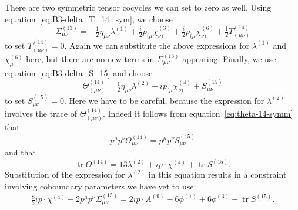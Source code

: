 \documentclass[11pt,reqno,a4paper,final]{amsart}
\theoremstyle{plain}
\theoremstyle{definition}
\newcommand{\phisup}[1]{\phi^{(#1)}}
\newcommand{\tr}{\operatorname{tr}}
\newcommand{\1}{\mathbb{1}}
\numberwithin{equation}{section}
\begin{document}
\begin{appendices}
There are two symmetric tensor cocycles we can set to zero as well.
Using equation~\eqref{eq:B3-delta_T_14_sym}, we choose
\begin{equation}
  \Sigma_{\mu\nu}^{(13)} = -\tfrac12 \eta_{\mu\nu} \lambda^{(1)} +   \tfrac i2 p_{(\mu} \chi_{\nu)}^{(3)} + \tfrac i2 p_{(\mu}  \chi_{\nu)}^{(6)} + \tfrac12 T_{(\mu\nu)}^{(14)}
\end{equation}
to set $T_{(\mu\nu)}^{(14)}=0$.  Again we can substitute
the above expressions for $\lambda^{(1)}$ and $\chi_\mu^{(6)}$ here,
but there are no new terms in $\Sigma_{\mu\nu}^{(13)}$ appearing.
Finally, we use equation~\eqref{eq:B3-delta_S_15} and choose
\begin{equation}
  \label{eq:theta-14-symm}
  \Theta_{(\mu\nu)}^{(14)}= \tfrac 12 \eta_{\mu\nu} \lambda^{(2)} + i  p_{(\mu} \chi_{\nu)}^{(4)} + S_{\mu\nu}^{(15)}
\end{equation}
to set $S_{\mu\nu}^{(15)}=0$.  Here we have to be careful, because the
expression for $\lambda^{(2)}$ involves the trace of
$\Theta_{(\mu\nu)}^{(14)}$.  Indeed it follows from
equation~\eqref{eq:theta-14-symm} that
\begin{equation}
  p^\mu p^\nu \Theta_{\mu\nu}^{(14)} = p^\mu p^\nu S_{\mu\nu}^{(15)}
\end{equation}
and that
\begin{equation}
  \tr\Theta^{(14)} = 13 \lambda^{(2)} + i p \cdot \chi^{(4)} + \tr S^{(15)}.
\end{equation}
Substitution of the expression for $\lambda^{(2)}$ in this equation
results in a constraint involving coboundary parameters we have yet to
use:
\begin{equation}
  \tfrac 83 i p \cdot \chi^{(4)} + 2 p^\mu p^\nu  \Sigma_{\mu\nu}^{(15)} = 2 i p \cdot A^{(9)} - 6 \phisup{1} + 6  \phisup{3} - \tr S^{(15)}.
\end{equation}


\end{appendices}
\end{document}
